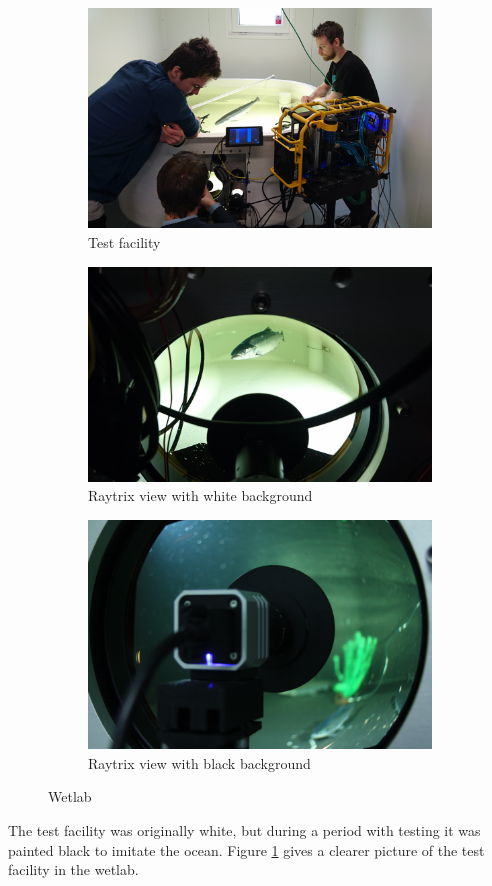 \begin{figure}[h]
    \centering
    \begin{subfigure}{1\textwidth}
        \centering
        \includegraphics[width=.6\linewidth]{images/hardware/wetlab_overview}
        \caption{Test facility} 
    \end{subfigure}\hspace*{\fill}
    
    \medskip
    \begin{subfigure}{1\textwidth}
        \centering
        \includegraphics[width=.6\linewidth]{images/hardware/wetlab_fish_dome}
        \caption{Raytrix view with white background} 
    \end{subfigure}\hspace*{\fill}
    
    \medskip
    \begin{subfigure}{1\textwidth}
        \centering
        \includegraphics[width=.6\linewidth]{images/hardware/wetlab_raytrix}
        \caption{Raytrix view with black background} 
    \end{subfigure}\hspace*{\fill}
    \caption{Wetlab \cite{website:sealab}}
    \label{fig:wetlab}
\end{figure}

The test facility was originally white, but during a period with testing it was painted black to imitate the ocean. Figure \ref{fig:wetlab} gives a clearer picture of the test facility in the wetlab.


